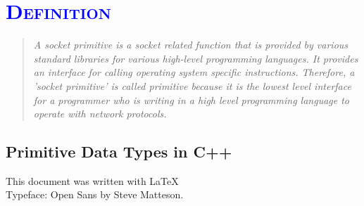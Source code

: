\documentclass[xcolor=dvipsnames]{article}
\begin{document}
\section{\scshape{\textcolor{blue}{Definition}}} \label{definition}

\begin{quote}

\textit{A socket primitive is a socket related function that is provided by various standard libraries for various high-level programming languages. It provides an interface for calling operating system specific instructions. Therefore, a 'socket primitive' is called primitive because it is the lowest level interface for a programmer who is writing in a high level programming language to operate with network protocols.}

\end{quote}

\begin{appendix}

\section{Primitive Data Types in C++}\label{c++_data_types}



\end{appendix}

\printnoidxglossaries

\newpage




\vfill
\begin{center}
This document was written with \LaTeX 
\\Typeface: Open Sans by Steve Matteson.
\end{center}

\end{document}
